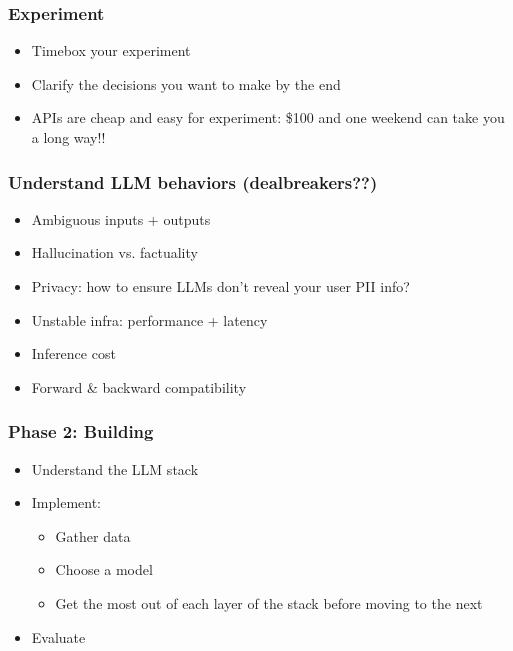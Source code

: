 \begin{frame}[fragile]\frametitle{Experiment}

\begin{itemize}
\item Timebox your experiment
\item Clarify the decisions you want to make by the end
\item APIs are cheap and easy for experiment: \$100 and one weekend can take you a long way!!
\end{itemize}	

\end{frame}

\begin{frame}[fragile]\frametitle{Understand LLM behaviors (dealbreakers??)}

\begin{itemize}
\item Ambiguous inputs + outputs
\item Hallucination vs. factuality
\item Privacy: how to ensure LLMs don’t reveal your user PII info?
\item Unstable infra: performance + latency
\item Inference cost
\item Forward \& backward compatibility
\end{itemize}	

\end{frame}

\begin{frame}[fragile]\frametitle{Phase 2: Building}

\begin{itemize}
\item Understand the LLM stack
\item Implement:
	\begin{itemize}
	\item Gather data
	\item Choose a model
	\item Get the most out of each layer of the stack before moving to the next
	\end{itemize}	
\item Evaluate
\end{itemize}	

\end{frame}

